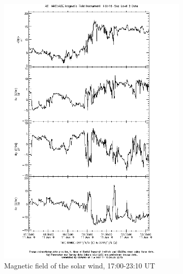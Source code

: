 \documentclass[10pt,a4paper]{article}
\begin{document}
\begin{figure}[h]
	\begin{subfigure}[h]{.5\textwidth}
		\centering
		\includegraphics[width=.8\linewidth]{ace-17-2310-b.png}
		\caption{Magnetic field of the solar wind, 17:00-23:10 UT}
		\label{ace1}
	\end{subfigure}
	\begin{subfigure}[h]{.5\textwidth}
		\centering

\end{subfigure}
\end{figure}
\end{document}
